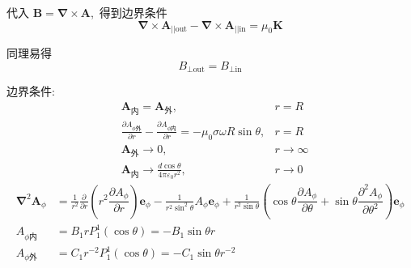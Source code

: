 代入 $\boldsymbol{B}=\boldsymbol\nabla\times\boldsymbol{A}$, \,得到边界条件
\begin{equation}
\boldsymbol\nabla\times\boldsymbol{A}_{||\text{out}}-
\boldsymbol\nabla\times\boldsymbol{A}_{||\text{in}}=\mu_0\boldsymbol{K}
\end{equation}

同理易得
\begin{equation}
    B_{\bot\text{out}}=B_{\bot\text{in}}
\end{equation}

边界条件:
\begin{align*}
    &\boldsymbol{A}_{\text{内}}=\boldsymbol{A}_{\text{外}},&r=R\\
    &\frac{\partial A_{\phi\text{外}}}{\partial r}-\frac{\partial A_{\phi\text{内}}}{\partial r}=-\mu_0\sigma\omega R\sin\theta,&r=R\\
    &\boldsymbol{A}_\text{外}\to0,&r\to\infty\\
    &\boldsymbol{A}_{\text{内}}\to\frac{d\cos\theta}{4\pi\varepsilon_0r^2},&r\to0
\end{align*}
\begin{align*}
\boldsymbol{\nabla}^2\boldsymbol{A}_\phi
&=\frac{1}{r^2}\frac{\partial}{\partial r}\left(r^2\dfrac{{\partial A_\phi}}{\partial r}\right)\boldsymbol{e}_\phi
-\frac{1}{r^2\sin^2\theta}A_\phi\boldsymbol{e}_\phi
+\frac{1}{r^2\sin\theta}\left(
\cos\theta\dfrac{{\partial A_\phi}}{\partial \theta}
+\sin\theta\dfrac{{\partial^2 A_\phi}}{\partial \theta^2}\right)\boldsymbol{e}_\phi\\
A_{\phi\text{内}}
&=B_1rP_1^1(\cos\theta)=-B_1\sin\theta r\\
A_{\phi\text{外}}
&=C_1r^{-2}P_1^1(\cos\theta)
=-C_1\sin\theta r^{-2}
\end{align*}
